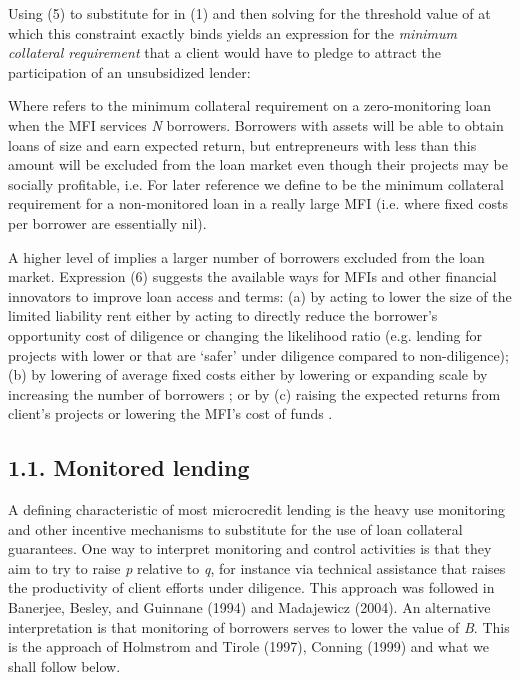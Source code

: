 \documentclass{article}
\begin{document}
Using (5) to substitute for in (1) and then solving for the threshold
value of at which this constraint exactly binds yields an expression for
the \emph{minimum collateral requirement} that a client would have to
pledge to attract the participation of an unsubsidized lender:

Where refers to the minimum collateral requirement on a zero-monitoring
loan when the MFI services \emph{N} borrowers. Borrowers with assets
will be able to obtain loans of size and earn expected return, but
entrepreneurs with less than this amount will be excluded from the loan
market even though their projects may be socially profitable, i.e. For
later reference we define to be the minimum collateral requirement for a
non-monitored loan in a really large MFI (i.e. where fixed costs per
borrower are essentially nil).

A higher level of implies a larger number of borrowers excluded from the
loan market. Expression (6) suggests the available ways for MFIs and
other financial innovators to improve loan access and terms: (a) by
acting to lower the size of the limited liability rent either by acting
to directly reduce the borrower's opportunity cost of diligence or
changing the likelihood ratio (e.g. lending for projects with lower or
that are `safer' under diligence compared to non-diligence); (b) by
lowering of average fixed costs either by lowering or expanding scale by
increasing the number of borrowers ; or by (c) raising the expected
returns from client's projects or lowering the MFI's cost of funds .

\subsection{1.1. Monitored lending}\label{monitored-lending}

A defining characteristic of most microcredit lending is the heavy use
monitoring and other incentive mechanisms to substitute for the use of
loan collateral guarantees. One way to interpret monitoring and control
activities is that they aim to try to raise \emph{p} relative to
\emph{q}, for instance via technical assistance that raises the
productivity of client efforts under diligence. This approach was
followed in Banerjee, Besley, and Guinnane (1994) and Madajewicz (2004).
An alternative interpretation is that monitoring of borrowers serves to
lower the value of \emph{B}. This is the approach of Holmstrom and
Tirole (1997), Conning (1999) and what we shall follow below.
\end{document}
